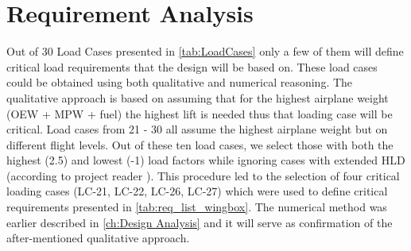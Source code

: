 \section{Requirement Analysis}
\label{sec:Req_Anal_WB}
Out of 30 Load Cases presented in \autoref{tab:LoadCases} only a few of them will define critical load requirements that the design will be based on. These load cases could be obtained using both qualitative and numerical reasoning.
\newline
The qualitative approach is based on assuming that for the highest airplane weight (OEW + MPW + fuel) the highest lift is needed thus that loading case will be critical. Load cases from 21 - 30 all assume the highest airplane weight but on different flight levels. Out of these ten load cases, we select those with both the highest (2.5) and lowest (-1) load factors while ignoring cases with extended HLD (according to project reader \cite{Timmer2024AE2111-IReader}). This procedure led to the selection of four critical loading cases (LC-21, LC-22, LC-26, LC-27) which were used to define critical requirements presented in \autoref{tab:req_list_wingbox}.
\newline
The numerical method was earlier described in \autoref{ch:Design Analysis} and it will serve as confirmation of the after-mentioned qualitative approach.

